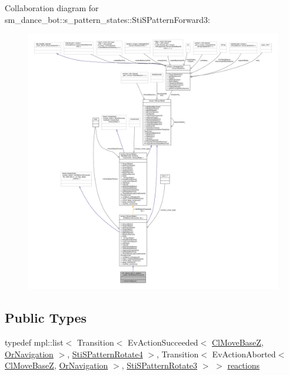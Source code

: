 Collaboration diagram for sm\+\_\+dance\+\_\+bot\+:\+:s\+\_\+pattern\+\_\+states\+:\+:Sti\+S\+Pattern\+Forward3\+:
\nopagebreak
\begin{figure}[H]
\begin{center}
\leavevmode
\includegraphics[width=350pt]{structsm__dance__bot_1_1s__pattern__states_1_1StiSPatternForward3__coll__graph}
\end{center}
\end{figure}
\subsection*{Public Types}
\begin{DoxyCompactItemize}
\item 
typedef mpl\+::list$<$ Transition$<$ Ev\+Action\+Succeeded$<$ \hyperlink{classmove__base__z__client_1_1ClMoveBaseZ}{Cl\+Move\+BaseZ}, \hyperlink{classsm__dance__bot_1_1OrNavigation}{Or\+Navigation} $>$, \hyperlink{structsm__dance__bot_1_1s__pattern__states_1_1StiSPatternRotate4}{Sti\+S\+Pattern\+Rotate4} $>$, Transition$<$ Ev\+Action\+Aborted$<$ \hyperlink{classmove__base__z__client_1_1ClMoveBaseZ}{Cl\+Move\+BaseZ}, \hyperlink{classsm__dance__bot_1_1OrNavigation}{Or\+Navigation} $>$, \hyperlink{structsm__dance__bot_1_1s__pattern__states_1_1StiSPatternRotate3}{Sti\+S\+Pattern\+Rotate3} $>$ $>$ \hyperlink{structsm__dance__bot_1_1s__pattern__states_1_1StiSPatternForward3_a7547d6e7da81d22253dcc9e93f8c29eb}{reactions}
\end{DoxyCompactItemize}
